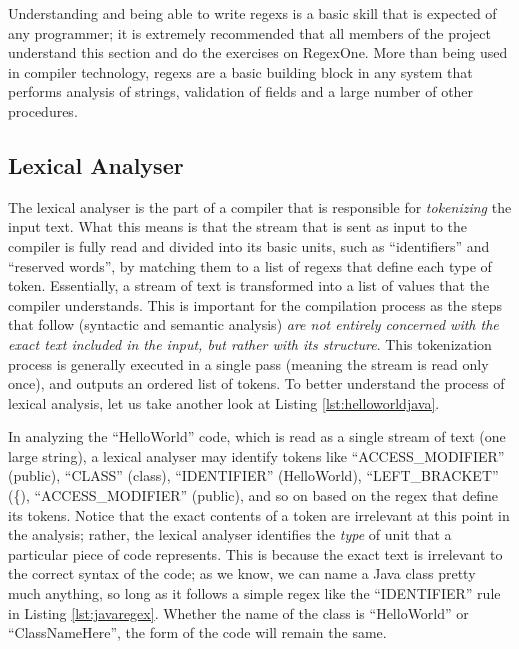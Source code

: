 Understanding and being able to write \gls{regex}s is a basic skill that is expected of any programmer; it is extremely recommended that all members of the project understand this section and do the exercises on RegexOne. More than being used in compiler technology, \gls{regex}s are a basic building block in any system that performs analysis of strings, validation of fields and a large number of other procedures.


\subsection{Lexical Analyser}
\label{sc:lex}

The lexical analyser is the part of a compiler that is responsible for \emph{tokenizing} the input text. What this means is that the stream that is sent as input to the compiler is fully read and divided into its basic units, such as ``identifiers'' and ``reserved words'', by matching them to a list of \gls{regex}s that define each type of token. Essentially, a stream of text is transformed into a list of values that the compiler understands. This is important for the compilation process as the steps that follow (syntactic and semantic analysis) \emph{are not entirely concerned with the exact text included in the input, but rather with its structure}. This tokenization process is generally executed in a single pass (meaning the stream is read only once), and outputs an ordered list of tokens. To better understand the process of lexical analysis, let us take another look at Listing \ref{lst:helloworldjava}.

In analyzing the ``HelloWorld'' code, which is read as a single stream of text (one large string), a lexical analyser may identify tokens like ``ACCESS_MODIFIER'' (public), ``CLASS'' (class), ``IDENTIFIER'' (HelloWorld), ``LEFT_BRACKET'' (\{), ``ACCESS_MODIFIER'' (public), and so on based on the \gls{regex} that define its tokens. Notice that the exact contents of a token are irrelevant at this point in the analysis; rather, the lexical analyser identifies the \emph{type} of unit that a particular piece of code represents. This is because the exact text is irrelevant to the correct syntax of the code; as we know, we can name a Java class pretty much anything, so long as it follows a simple \gls{regex} like the ``IDENTIFIER'' rule in Listing \ref{lst:javaregex}. Whether the name of the class is ``HelloWorld'' or ``ClassNameHere'', the form of the code will remain the same.

